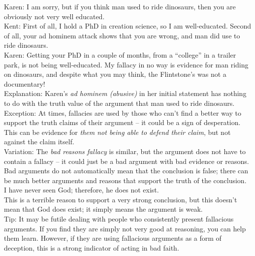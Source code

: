 \documentclass[a4paper,12pt,single,pdftex]{scrartcl}
\begin{document}
    
      Karen: I am sorry, but if you think man used to ride dinosaurs, then you are obviously not very well educated.
    \\

    
      Kent:  First of all, I hold a PhD in creation science, so I am well-educated.  Second of all, your ad hominem attack shows that you are wrong, and man did use to ride dinosaurs.
    \\

    
      Karen:  Getting your PhD in a couple of months, from a “college” in a trailer park, is not being well-educated.  My fallacy in no way is evidence for man riding on dinosaurs, and despite what you may think, the Flintstone’s was not a documentary!
    \\

    
      Explanation: Karen’s {\it ad hominem (abusive)} in her initial statement has nothing to do with the truth value of the argument that man used to ride dinosaurs.
    \\

    
      Exception: At times, fallacies are used by those who can’t find a better way to support the truth claims of their argument -- it could be a sign of desperation.  This can be evidence for {\it them not being able to defend their claim}, but not against the claim itself.
    \\

    
      Variation: The {\it bad reasons fallacy} is similar, but the argument does not have to contain a fallacy -- it could just be a bad argument with bad evidence or reasons.  Bad arguments do not automatically mean that the conclusion is false; there can be much better arguments and reasons that support the truth of the conclusion.
    \\

    
      I have never seen God; therefore, he does not exist.
    \\

    
      This is a terrible reason to support a very strong conclusion, but this doesn’t mean that God does exist; it simply means the argument is weak.
    \\

    
      Tip: It may be futile dealing with people who consistently present fallacious arguments. If you find they are simply not very good at reasoning, you can help them learn. However, if they are using fallacious arguments as a form of deception, this is a strong indicator of acting in bad faith.
    \\
\end{document}
